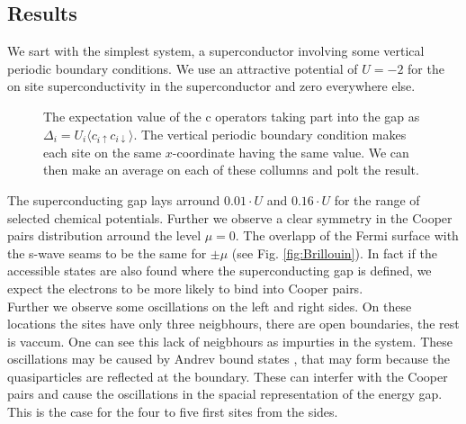\documentclass[..\main.tex]{subfile}
\begin{document}
\subsection{Results}
We sart with the simplest system, a superconductor involving some vertical periodic boundary conditions.
We use an attractive potential of $U=-2$ for the on site superconductivity in the superconductor and zero everywhere else.
\begin{figure}[H]
  \centering
  
  \caption{The expectation value of the c operators taking part into the gap as $\Delta_i = U_i\langle c_{i\uparrow}c_{i\downarrow}\rangle$. The  
  vertical periodic boundary condition makes each site on the same $x$-coordinate having the same value.
    We can then make an average on each of these collumns and polt the result.}
\end{figure}
The superconducting gap lays arround $0.01\cdot U$ and $0.16\cdot U$  for the range of selected chemical potentials. Further we observe a 
clear symmetry in the Cooper pairs distribution arround the level $\mu =0$. The overlapp of the Fermi surface with the s-wave seams
to be the same for $\pm\mu$ (see Fig. \ref{fig:Brillouin}). In fact if the accessible states are also found where the superconducting gap 
is defined, we expect the electrons to be more likely to bind into Cooper pairs.\\   
Further we observe some oscillations on the left and right sides. On these locations the sites have only three
neigbhours, there are open boundaries, the rest is vaccum. One can see this lack of neigbhours as impurties in the system. 
These oscillations may be caused by Andrev bound states \cite{Bobkov_2024}, that may form because the quasiparticles are reflected at the boundary.
These can interfer with the Cooper pairs and cause the oscillations in the spacial representation of the energy gap. This is the case for the four to 
five first sites from the sides.\\
\end{document}
